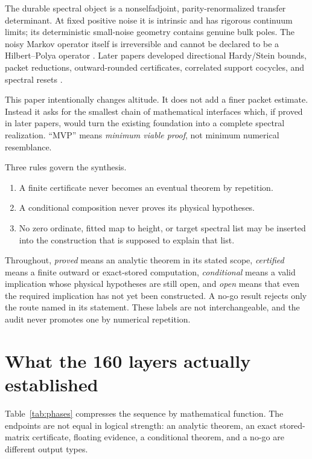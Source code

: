 \documentclass[11pt]{article}
\theoremstyle{definition}
\theoremstyle{remark}
\begin{document}
The durable spectral object is a nonselfadjoint, parity-renormalized transfer
determinant.  At fixed positive noise it is intrinsic and has rigorous
continuum limits; its deterministic small-noise geometry contains genuine
bulk poles.  The noisy Markov operator itself is irreversible and cannot be
declared to be a Hilbert--Polya operator \citep{WangRH7,WangRH45}.  Later
papers developed directional Hardy/Stein bounds, packet reductions,
outward-rounded certificates, correlated support cocycles, and spectral
resets \citep{WangRH50,WangRH100,WangRH149,WangRH160}.

This paper intentionally changes altitude.  It does not add a finer packet
estimate.  Instead it asks for the smallest chain of mathematical interfaces
which, if proved in later papers, would turn the existing foundation into a
complete spectral realization.  ``MVP'' means \emph{minimum viable proof},
not minimum numerical resemblance.

Three rules govern the synthesis.
\begin{enumerate}[label=\textbf{R\arabic*.},leftmargin=3.2em]
\item A finite certificate never becomes an eventual theorem by repetition.
\item A conditional composition never proves its physical hypotheses.
\item No zero ordinate, fitted map to height, or target spectral list may be
inserted into the construction that is supposed to explain that list.
\end{enumerate}

Throughout, \emph{proved} means an analytic theorem in its stated scope,
\emph{certified} means a finite outward or exact-stored computation,
\emph{conditional} means a valid implication whose physical hypotheses are
still open, and \emph{open} means that even the required implication has not
yet been constructed.  A no-go result rejects only the route named in its
statement.  These labels are not interchangeable, and the audit never
promotes one by numerical repetition.

\section{What the 160 layers actually established}

Table~\ref{tab:phases} compresses the sequence by mathematical function.
The endpoints are not equal in logical strength: an analytic theorem, an
exact stored-matrix certificate, floating evidence, a conditional theorem,
and a no-go are different output types.
\end{document}
